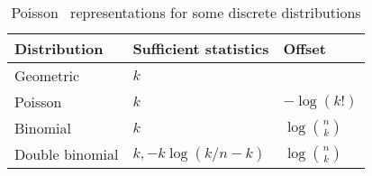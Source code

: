 \begin{table}[htb]
 \caption{Poisson \loglin\ representations for some discrete distributions}\label{tab:expfamily}
 \begin{center}
 \begin{tabular}{lll}
  \hline
  Distribution & Sufficient statistics & Offset \\
  \hline
  Geometric & $k$ \\
  Poisson & $k$ & $-\log(k!)$ \\
  Binomial & $k$ & $\log{\binom{n}{k}}$ \\
  Double binomial & $k, -k \log(k/n-k)$ & $\log{\binom{n}{k}}$ \\
  \hline
 \end{tabular}
 \end{center}
\end{table}
